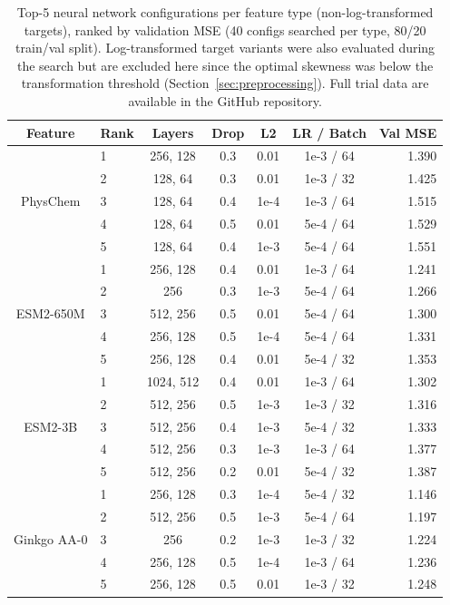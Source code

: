 \documentclass[12pt]{article}
\begin{document}
\begin{table}[H]
\centering
\caption{Top-5 neural network configurations per feature type (non-log-transformed targets), ranked by validation MSE (40 configs searched per type, 80/20 train/val split). Log-transformed target variants were also evaluated during the search but are excluded here since the optimal skewness was below the transformation threshold (Section~\ref{sec:preprocessing}). Full trial data are available in the GitHub repository.}
\label{tab:nn_trials}
\small
\begin{tabular}{clccccr}
\toprule
Feature & Rank & Layers & Drop & L2 & LR / Batch & Val MSE \\
\midrule
\multirow{5}{*}{PhysChem}
 & 1 & 256, 128 & 0.3 & 0.01 & 1e-3 / 64 & 1.390 \\
 & 2 & 128, 64 & 0.3 & 0.01 & 1e-3 / 32 & 1.425 \\
 & 3 & 128, 64 & 0.4 & 1e-4 & 1e-3 / 64 & 1.515 \\
 & 4 & 128, 64 & 0.5 & 0.01 & 5e-4 / 64 & 1.529 \\
 & 5 & 128, 64 & 0.4 & 1e-3 & 5e-4 / 64 & 1.551 \\
\midrule
\multirow{5}{*}{ESM2-650M}
 & 1 & 256, 128 & 0.4 & 0.01 & 1e-3 / 64 & 1.241 \\
 & 2 & 256 & 0.3 & 1e-3 & 5e-4 / 64 & 1.266 \\
 & 3 & 512, 256 & 0.5 & 0.01 & 5e-4 / 64 & 1.300 \\
 & 4 & 256, 128 & 0.5 & 1e-4 & 5e-4 / 64 & 1.331 \\
 & 5 & 256, 128 & 0.4 & 0.01 & 5e-4 / 32 & 1.353 \\
\midrule
\multirow{5}{*}{ESM2-3B}
 & 1 & 1024, 512 & 0.4 & 0.01 & 1e-3 / 64 & 1.302 \\
 & 2 & 512, 256 & 0.5 & 1e-3 & 1e-3 / 32 & 1.316 \\
 & 3 & 512, 256 & 0.4 & 1e-3 & 5e-4 / 32 & 1.333 \\
 & 4 & 512, 256 & 0.3 & 1e-3 & 1e-3 / 64 & 1.377 \\
 & 5 & 512, 256 & 0.2 & 0.01 & 5e-4 / 32 & 1.387 \\
\midrule
\multirow{5}{*}{Ginkgo AA-0}
 & 1 & 256, 128 & 0.3 & 1e-4 & 5e-4 / 32 & 1.146 \\
 & 2 & 512, 256 & 0.5 & 1e-3 & 5e-4 / 64 & 1.197 \\
 & 3 & 256 & 0.2 & 1e-3 & 1e-3 / 32 & 1.224 \\
 & 4 & 256, 128 & 0.5 & 1e-4 & 1e-3 / 64 & 1.236 \\
 & 5 & 256, 128 & 0.5 & 0.01 & 1e-3 / 32 & 1.248 \\
\bottomrule
\end{tabular}
\end{table}
\end{document}

